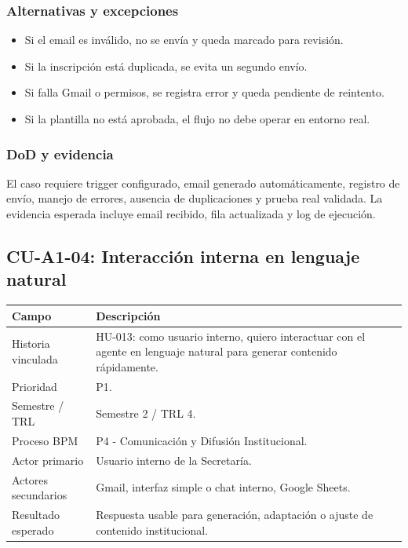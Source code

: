 \documentclass[11pt,a4paper]{article}
\begin{document}
\subsubsection{Alternativas y excepciones}

\begin{itemize}
  \item Si el email es inválido, no se envía y queda marcado para revisión.
  \item Si la inscripción está duplicada, se evita un segundo envío.
  \item Si falla Gmail o permisos, se registra error y queda pendiente de reintento.
  \item Si la plantilla no está aprobada, el flujo no debe operar en entorno real.
\end{itemize}

\subsubsection{DoD y evidencia}

El caso requiere trigger configurado, email generado automáticamente, registro de envío, manejo de errores, ausencia de duplicaciones y prueba real validada. La evidencia esperada incluye email recibido, fila actualizada y log de ejecución.

\subsection{CU-A1-04: Interacción interna en lenguaje natural}

\begin{tabularx}{\textwidth}{p{}Y}
\toprule
\textbf{Campo} & \textbf{Descripción} \\
\midrule
Historia vinculada & HU-013: como usuario interno, quiero interactuar con el agente en lenguaje natural para generar contenido rápidamente. \\
Prioridad & P1. \\
Semestre / TRL & Semestre 2 / TRL 4. \\
Proceso BPM & P4 - Comunicación y Difusión Institucional. \\
Actor primario & Usuario interno de la Secretaría. \\
Actores secundarios & Gmail, interfaz simple o chat interno, Google Sheets. \\
Resultado esperado & Respuesta usable para generación, adaptación o ajuste de contenido institucional. \\
\bottomrule
\end{tabularx}
\end{document}
